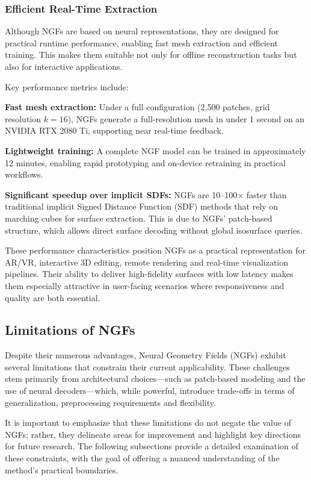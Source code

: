 \subsubsection{Efficient Real-Time Extraction}

Although NGFs are based on neural representations, they are designed for practical runtime performance, enabling fast mesh extraction and efficient training. 
This makes them suitable not only for offline reconstruction tasks but also for interactive applications. 

Key performance metrics include: 

\textbf{Fast mesh extraction:} Under a full configuration (2,500 patches, grid resolution $k=16$), NGFs generate a full-resolution mesh in under 1 second on an NVIDIA RTX 2080 Ti, supporting near real-time feedback. 

\textbf{Lightweight training:} A complete NGF model can be trained in approximately 12 minutes, enabling rapid prototyping and on-device retraining in practical workflows. 

\textbf{Significant speedup over implicit SDFs:} NGFs are 10--100$\times$ faster than traditional implicit Signed Distance Function (SDF) methods that rely on marching cubes for surface extraction. 
This is due to NGFs’ patch-based structure, which allows direct surface decoding without global isosurface queries. 

These performance characteristics position NGFs as a practical representation for AR/VR, interactive 3D editing, remote rendering and real-time visualization pipelines. 
Their ability to deliver high-fidelity surfaces with low latency makes them especially attractive in user-facing scenarios where responsiveness and quality are both essential. 

\subsection{Limitations of NGFs}

Despite their numerous advantages, Neural Geometry Fields (NGFs) exhibit several limitations that constrain their current applicability. 
These challenges stem primarily from architectural choices—such as patch-based modeling and the use of neural decoders—which, while powerful, introduce trade-offs in terms of generalization, preprocessing requirements and flexibility. 

It is important to emphasize that these limitations do not negate the value of NGFs; rather, they delineate areas for improvement and highlight key directions for future research. 
The following subsections provide a detailed examination of these constraints, with the goal of offering a nuanced understanding of the method’s practical boundaries. 


